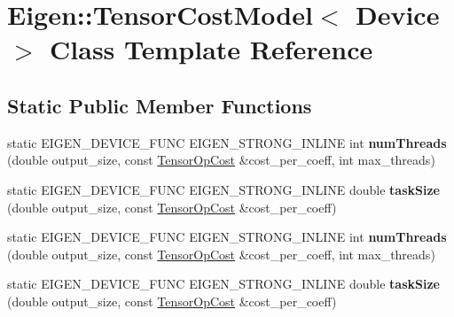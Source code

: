 \hypertarget{class_eigen_1_1_tensor_cost_model}{}\section{Eigen\+:\+:Tensor\+Cost\+Model$<$ Device $>$ Class Template Reference}
\label{class_eigen_1_1_tensor_cost_model}
\subsection*{Static Public Member Functions}
\begin{DoxyCompactItemize}
\item 
\mbox{\label{class_eigen_1_1_tensor_cost_model_a718b68d6a884d2c862b5dc3c4c3f5ab4}} 
static E\+I\+G\+E\+N\+\_\+\+D\+E\+V\+I\+C\+E\+\_\+\+F\+U\+NC E\+I\+G\+E\+N\+\_\+\+S\+T\+R\+O\+N\+G\+\_\+\+I\+N\+L\+I\+NE int {\bfseries num\+Threads} (double output\+\_\+size, const \hyperlink{class_eigen_1_1_tensor_op_cost}{Tensor\+Op\+Cost} \&cost\+\_\+per\+\_\+coeff, int max\+\_\+threads)
\item 
\mbox{\label{class_eigen_1_1_tensor_cost_model_aaae32b6af60750622e87ac1f34766c1b}} 
static E\+I\+G\+E\+N\+\_\+\+D\+E\+V\+I\+C\+E\+\_\+\+F\+U\+NC E\+I\+G\+E\+N\+\_\+\+S\+T\+R\+O\+N\+G\+\_\+\+I\+N\+L\+I\+NE double {\bfseries task\+Size} (double output\+\_\+size, const \hyperlink{class_eigen_1_1_tensor_op_cost}{Tensor\+Op\+Cost} \&cost\+\_\+per\+\_\+coeff)
\item 
\mbox{\label{class_eigen_1_1_tensor_cost_model_a718b68d6a884d2c862b5dc3c4c3f5ab4}} 
static E\+I\+G\+E\+N\+\_\+\+D\+E\+V\+I\+C\+E\+\_\+\+F\+U\+NC E\+I\+G\+E\+N\+\_\+\+S\+T\+R\+O\+N\+G\+\_\+\+I\+N\+L\+I\+NE int {\bfseries num\+Threads} (double output\+\_\+size, const \hyperlink{class_eigen_1_1_tensor_op_cost}{Tensor\+Op\+Cost} \&cost\+\_\+per\+\_\+coeff, int max\+\_\+threads)
\item 
\mbox{\label{class_eigen_1_1_tensor_cost_model_aaae32b6af60750622e87ac1f34766c1b}} 
static E\+I\+G\+E\+N\+\_\+\+D\+E\+V\+I\+C\+E\+\_\+\+F\+U\+NC E\+I\+G\+E\+N\+\_\+\+S\+T\+R\+O\+N\+G\+\_\+\+I\+N\+L\+I\+NE double {\bfseries task\+Size} (double output\+\_\+size, const \hyperlink{class_eigen_1_1_tensor_op_cost}{Tensor\+Op\+Cost} \&cost\+\_\+per\+\_\+coeff)
\end{DoxyCompactItemize}
